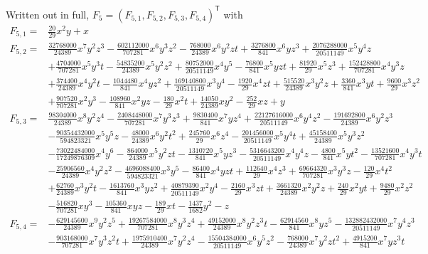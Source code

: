 \documentclass[11pt]{article}
\theoremstyle{plain}
\theoremstyle{definition}
\theoremstyle{remark}
\begin{document}
Written out in full,
$F_5=(F_{5,1},F_{5,2},F_{5,3},F_{5,4})^{\mathsf T}$ with
{\small
\begin{align*}
F_{5,1} ={}& \tfrac{20}{29}x^2y+x\\[2pt]
F_{5,2} ={}& \tfrac{32768000}{24389}x^7y^2z^3-\tfrac{602112000}{707281}x^6y^3z^2-\tfrac{768000}{24389}x^6y^2zt+\tfrac{3276800}{841}x^6yz^3+\tfrac{2076288000}{20511149}x^5y^4z\\
&+\tfrac{4704000}{707281}x^5y^3t-\tfrac{54835200}{24389}x^5y^2z^2+\tfrac{80752000}{20511149}x^4y^5-\tfrac{76800}{841}x^5yzt+\tfrac{81920}{29}x^5z^3+\tfrac{152428800}{707281}x^4y^3z\\
&+\tfrac{374400}{24389}x^4y^2t-\tfrac{1044480}{841}x^4yz^2+\tfrac{169140800}{20511149}x^3y^4-\tfrac{1920}{29}x^4zt+\tfrac{515520}{24389}x^3y^2z+\tfrac{3360}{841}x^3yt+\tfrac{9600}{29}x^3z^2\\
&+\tfrac{907520}{707281}x^2y^3-\tfrac{108960}{841}x^2yz-\tfrac{180}{29}x^2t+\tfrac{14050}{24389}xy^2-\tfrac{252}{29}xz+y\\[2pt]
F_{5,3} ={}& \tfrac{98304000}{24389}x^8y^2z^4-\tfrac{2408448000}{707281}x^7y^3z^3+\tfrac{9830400}{841}x^7yz^4+\tfrac{22127616000}{20511149}x^6y^4z^2-\tfrac{191692800}{24389}x^6y^2z^3\\
&-\tfrac{90354432000}{594823321}x^5y^5z-\tfrac{48000}{24389}x^6y^2t^2+\tfrac{245760}{29}x^6z^4-\tfrac{201456000}{20511149}x^5y^4t+\tfrac{45158400}{24389}x^5y^3z^2\\
&-\tfrac{73022484000}{17249876309}x^4y^6-\tfrac{864000}{24389}x^5y^2zt-\tfrac{1310720}{841}x^5yz^3-\tfrac{5316643200}{20511149}x^4y^4z-\tfrac{4800}{841}x^5yt^2-\tfrac{13521600}{707281}x^4y^3t\\
&-\tfrac{25906560}{24389}x^4y^2z^2-\tfrac{4696088400}{594823321}x^3y^5-\tfrac{86400}{841}x^4yzt+\tfrac{112640}{29}x^4z^3+\tfrac{69664320}{707281}x^3y^3z-\tfrac{120}{29}x^4t^2\\
&+\tfrac{62760}{24389}x^3y^2t-\tfrac{1613760}{841}x^3yz^2+\tfrac{40879390}{20511149}x^2y^4-\tfrac{2160}{29}x^3zt+\tfrac{3661320}{24389}x^2y^2z+\tfrac{240}{29}x^2yt+\tfrac{9480}{29}x^2z^2\\
&-\tfrac{516820}{707281}xy^3-\tfrac{105360}{841}xyz-\tfrac{189}{29}xt-\tfrac{1437}{1682}y^2-z\\[2pt]
F_{5,4} ={}& -\tfrac{629145600}{24389}x^9y^2z^5+\tfrac{19267584000}{707281}x^8y^3z^4+\tfrac{49152000}{24389}x^8y^2z^3t-\tfrac{62914560}{841}x^8yz^5-\tfrac{132882432000}{20511149}x^7y^4z^3\\
&-\tfrac{903168000}{707281}x^7y^3z^2t+\tfrac{1975910400}{24389}x^7y^2z^4-\tfrac{15504384000}{20511149}x^6y^5z^2-\tfrac{768000}{24389}x^7y^2zt^2+\tfrac{4915200}{841}x^7yz^3t\\

\end{align*}}
\end{document}
